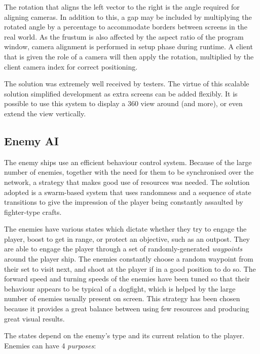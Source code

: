 \documentclass[a4paper,11pt]{article}
\begin{document}
The rotation that aligns the left vector to the right is the angle required for aligning cameras. In addition to this, a gap may be included by multiplying the rotated angle by a percentage to accommodate borders between screens in the real world. As the frustum is also affected by the aspect ratio of the program window, camera alignment is performed in setup phase during runtime. A client that is given the role of a camera will then apply the rotation, multiplied by the client camera index for correct positioning.

The solution was extremely well received by testers. The virtue of this scalable solution simplified development as extra screens can be added flexibly. It is possible to use this system to display a 360 view around (and more), or even extend the view vertically.


\subsection{Enemy AI}
The enemy ships use an efficient behaviour control system. Because of the large number of enemies, together with the need for them to be synchronised over the network, a strategy that makes good use of resources was needed. The solution adopted is a swarm-based system that uses randomness and a sequence of state transitions to give the impression of the player being constantly assaulted by fighter-type crafts. 

The enemies have various states which dictate whether they try to engage the player, boost to get in range, or protect an objective, such as an outpost. They are able to engage the player through a set of randomly-generated \emph{waypoints} around the player ship. The enemies constantly choose a random waypoint from their set to visit next, and shoot at the player if in a good position to do so. The forward speed and turning speeds of the enemies have been tuned so that their behaviour appears to be typical of a dogfight, which is helped by the large number of enemies usually present on screen. This strategy has been chosen because it provides a great balance between using few resources and producing great visual results.

The states depend on the enemy’s type and its current relation to the player. Enemies can have 4 \emph{purposes}:
\end{document}
